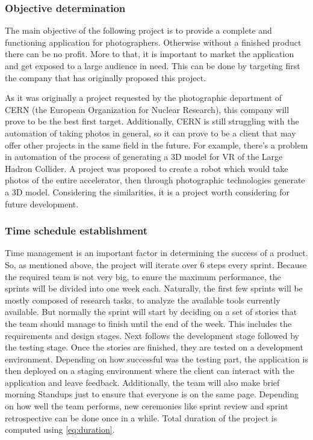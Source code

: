\subsubsection{Objective determination}
The main objective of the following project is to provide a complete and functioning application for photographers. Otherwise without a finished product there can be no profit. More to that, it is important to market the application and get exposed to a large audience in need. This can be done by targeting first the company that has originally proposed this project.

As it was originally a project requested by the photographic department of CERN (the European Organization for Nuclear Research), this company will prove to be the best first target. Additionally, CERN is still struggling with the automation of taking photos in general, so it can prove to be a client that may offer other projects in the same field in the future. For example, there's a problem in automation of the process of generating a 3D model for VR of the Large Hadron Collider. A project was proposed to create a robot which would take photos of the entire accelerator, then through photographic technologies generate a 3D model. Considering the similarities, it is a project worth considering for future development.

\subsubsection{Time schedule establishment}
Time management is an important factor in determining the success of a product. So, as mentioned above, the project will iterate over 6 steps every sprint. Because the required team is not very big, to enure the maximum performance, the sprints will be divided into one week each. Naturally, the first few sprints will be mostly composed of research tasks, to analyze the available tools currently available. But normally the sprint will start by deciding on a set of stories that the team should manage to finish until the end of the week. This includes the requirements and design stages. Next follows the development stage followed by the testing stage. Once the stories are finished, they are tested on a development environment. Depending on how successful was the testing part, the application is then deployed on a staging environment where the client can interact with the application and leave feedback. Additionally, the team will also make brief morning Standups just to ensure that everyone is on the same page. Depending on how well the team performs, new ceremonies like sprint review and sprint retrospective can be done once in a while. Total duration of the project is computed using \eqref{eq:duration}.

